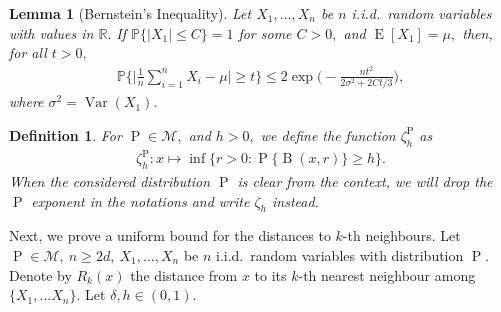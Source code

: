 \documentclass[10pt]{article}
\newcommand{\mM}{\mathcal{M}}
\newcommand{\PP}{\mathbb{P}}
\newcommand{\RR}{\mathbb{R}}
\newcommand{\B}{\operatorname{B}}
\newcommand{\E}{\operatorname{E}}
\renewcommand{\P}{\operatorname{P}}
\newcommand{\Var}{\operatorname{Var}}
\newtheorem{lemma}[theorem]{Lemma}
\newtheorem{definition}[theorem]{Definition}
\begin{document}
\begin{lemma}[Bernstein's Inequality]
    Let $X_1, \dots, X_n$ be $n$ i.i.d.\ random variables with values in $\RR.$ If $\PP\{|X_1| \leq C\} = 1$ for some $C > 0,$ and $\E[X_1] = \mu,$ then, for all $t > 0,$
    \begin{align}
        \label{eq.Bernstein}
        \PP\bigg\{\Big|\frac 1n \sum_{i=1}^n X_i - \mu\Big| \geq t\bigg\} \leq 2\exp\bigg(-\frac{nt^2}{2\sigma^2 + 2Ct/3}\bigg),
    \end{align}
    where $\sigma^2 = \Var(X_1).$
\end{lemma}
\begin{definition}
    For $\P \in \mM,$ and $h > 0,$ we define the function $\zeta_h^{\P}$ as 
    \begin{align}
        \label{eq.zeta.definition}
        \zeta_h^{\P}\colon x\mapsto \inf\Big\{r > 0: \P\{\B(x, r)\} \geq h\Big\}.
    \end{align}
    When the considered distribution $\P$ is clear from the context, we will drop the $\P$ exponent in the notations and write $\zeta_h$ instead.
\end{definition}
Next, we prove a uniform bound for the distances to $k$-th neighbours. Let $\P \in \mM, \ n \geq 2d, \ X_1, \dots, X_n$ be $n$ i.i.d.\ random variables with distribution $\P.$ Denote by $R_k(x)$ the distance from $x$ to its $k$-th nearest neighbour among $\{X_1, \dots X_n\}.$ Let $\delta, h \in (0, 1).$
\end{document}

